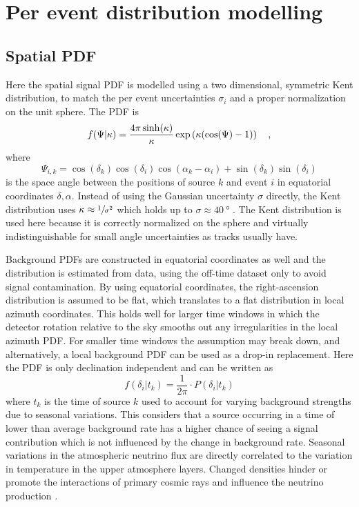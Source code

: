 \section{Per event distribution modelling}
\subsection*{Spatial PDF}
Here the spatial signal PDF is modelled using a two dimensional, symmetric Kent distribution, to match the per event uncertainties $\sigma_i$ and a proper normalization on the unit sphere.
The PDF is
\begin{equation}
  f(\Psi|\kappa)
  = \frac{4\pi \sinh(\kappa)}{\kappa}\exp\left(\kappa(\cos(\Psi)-1)\right)
  \quad\text{,}
\end{equation}
where
\begin{equation}
  \Psi_{i,k}
  = \cos(\delta_k)\cos(\delta_i)\cos(\alpha_k - \alpha_i) +
    \sin(\delta_k)\sin(\delta_i)
\end{equation}
is the space angle between the positions of source $k$ and event $i$ in equatorial coordinates $\delta, \alpha$.
Instead of using the Gaussian uncertainty $\sigma$ directly, the Kent distribution uses $\kappa \approx \sfrac{1}{\sigma^2}$ which holds up to $\sigma \approx \SI{40}{\degree}$ .
The Kent distribution is used here because it is correctly normalized on the sphere and virtually indistinguishable for small angle uncertainties as tracks usually have.

Background PDFs are constructed in equatorial coordinates as well and the distribution is estimated from data, using the off-time dataset only to avoid signal contamination.
By using equatorial coordinates, the right-ascension distribution is assumed to be flat, which translates to a flat distribution in local azimuth coordinates.
This holds well for larger time windows in which the detector rotation relative to the sky smooths out any irregularities in the local azimuth PDF.
For smaller time windows the assumption may break down, and alternatively, a local background PDF can be used as a drop-in replacement.
Here the PDF is only declination independent and can be written as
\begin{equation}
  f(\delta_i|t_k) = \frac{1}{2\pi}\cdot P(\delta_i|t_k)
\end{equation}
where $t_k$ is the time of source $k$ used to account for varying background strengths due to seasonal variations.
This considers that a source occurring in a time of lower than average background rate has a higher chance of seeing a signal contribution which is not influenced by the change in background rate.
Seasonal variations in the atmospheric neutrino flux are directly correlated to the variation in temperature in the upper atmosphere layers.
Changed densities hinder or promote the interactions of primary cosmic rays and influence the neutrino production .


